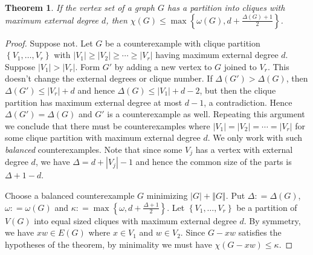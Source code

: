 \documentclass[12pt]{article}
\theoremstyle{plain}
\newtheorem{thm}{Theorem}[section]
\theoremstyle{definition}
\theoremstyle{remark}
\newcommand{\set}[1]{\left\{ #1 \right\}}
\newcommand{\card}[1]{\left|#1\right|}
\newcommand{\size}[1]{\left\Vert#1\right\Vert}
\newcommand{\DefinedAs}{\mathrel{\mathop:}=}
\begin{document}
\begin{thm}\label{HaxellGeneralized}
If the vertex set of a graph $G$ has a partition into cliques with maximum external degree $d$, then $\chi(G) \le \max\set{\omega(G), d + \frac{\Delta(G) + 1}{2}}$.
\end{thm}
\begin{proof}
Suppose not.  Let $G$ be a counterexample with clique partition $\set{V_1, \ldots, V_r}$ with $|V_1| \ge |V_2| \ge \cdots \ge |V_r|$ having maximum external degree $d$.  Suppose $|V_1| > |V_r|$.  Form $G'$ by adding a new vertex to $G$ joined to $V_r$.  This doesn't change the external degrees or clique number.  If $\Delta(G') > \Delta(G)$, then $\Delta(G') \le |V_r| + d$ and hence $\Delta(G) \le |V_1| + d-2$, but then the clique partition has maximum external degree at most $d-1$, a contradiction.  Hence $\Delta(G') = \Delta(G)$ and $G'$ is a counterexample as well.  Repeating this argument we conclude that there must be counterexamples where $|V_1|=|V_2|=\cdots=|V_r|$ for some clique partition with maximum external degree $d$.  We only work with such \emph{balanced} counterexamples. Note that since some $V_j$ has a vertex with external degree $d$, we have $\Delta = d + |V_j| - 1$ and hence the common size of the parts is $\Delta + 1 - d$.

Choose a balanced counterexample $G$ minimizing $\card{G} + \size{G}$.  Put $\Delta \DefinedAs \Delta(G)$, $\omega \DefinedAs \omega(G)$ and $\kappa \DefinedAs \max\set{\omega, d + \frac{\Delta + 1}{2}}$. Let $\set{V_1, \ldots, V_r}$ be a partition of $V(G)$ into equal sized cliques with maximum external degree $d$.  By symmetry, we have $xw \in E(G)$ where $x \in V_1$ and $w \in V_2$.  Since $G - xw$ satisfies the hypotheses of the theorem, by minimality we must have $\chi(G - xw) \le \kappa$.  


\end{proof}
\end{document}
